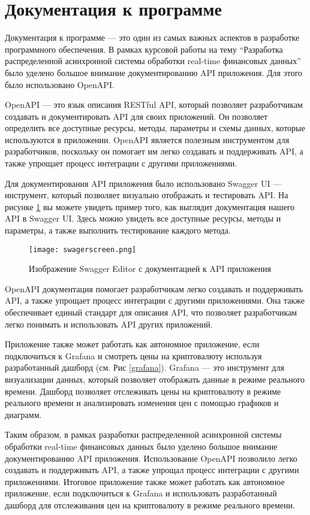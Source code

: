 \section{Документация к программе}

Документация к программе --- это один из самых важных аспектов в разработке
программного обеспечения. В рамках курсовой работы на тему ``Разработка
распределенной асинхронной системы обработки real-time финансовых данных'' было
уделено большое внимание документированию API приложения. Для этого было
использовано OpenAPI.

OpenAPI --- это язык описания RESTful API, который позволяет разработчикам
создавать и документировать API для своих приложений. Он позволяет определить
все доступные ресурсы, методы, параметры и схемы данных, которые используются в
приложении. OpenAPI является полезным инструментом для разработчиков, поскольку
он помогает им легко создавать и поддерживать API, а также упрощает процесс
интеграции с другими приложениями.

Для документирования API приложения было использовано Swagger UI ---
инструмент, который позволяет визуально отображать и тестировать API. На рисунке \ref{swager}
вы можете увидеть пример того, как выглядит документация нашего API в Swagger UI.
Здесь можно увидеть все доступные ресурсы, методы и параметры, а также выполнить
тестирование каждого метода.

\begin{figure}[h]
    \centering
    \texttt{[image: swagerscreen.png]}
    \caption{Изображение Swagger Editor с документацией к API приложения}
    \label{swager}
\end{figure}

OpenAPI документация помогает разработчикам легко создавать и поддерживать API,
а также упрощает процесс интеграции с другими приложениями. Она также
обеспечивает единый стандарт для описания API, что позволяет разработчикам легко
понимать и использовать API других приложений.

Приложение также может работать как автономное приложение, если
подключиться к Grafana и смотреть цены на криптовалюту используя
разработанный дашборд (см. Рис \ref{grafana}).
Grafana --- это инструмент для визуализации данных,
который позволяет отображать данные в режиме реального времени. Дашборд
позволяет отслеживать цены на криптовалюту в режиме реального времени и
анализировать изменения цен с помощью графиков и диаграмм.

Таким образом, в рамках разработки распределенной асинхронной системы
обработки real-time финансовых данных было уделено большое внимание
документированию API приложения. Использование OpenAPI позволило
легко создавать и поддерживать API, а также упрощал процесс интеграции с другими
приложениями. Итоговое приложение также может работать как автономное приложение,
если подключиться к Grafana и использовать разработанный дашборд для
отслеживания цен на криптовалюту в режиме реального времени.